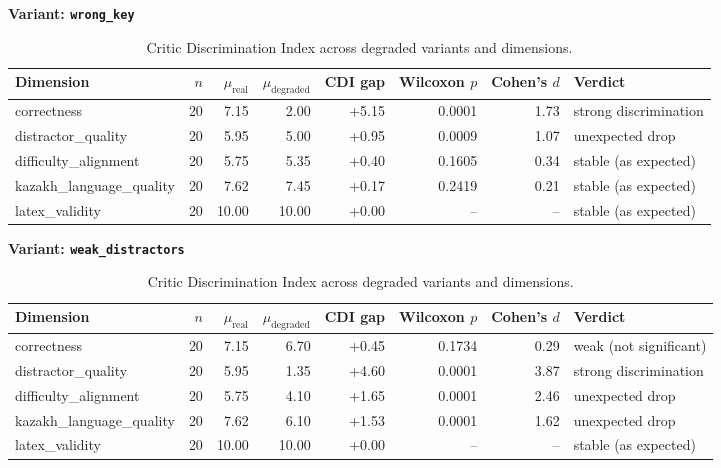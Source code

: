 \begin{table}[t]
\centering
\caption{Critic Discrimination Index across degraded variants and dimensions.}
\label{tab:cdi}
\vspace{0.5em}
\textbf{Variant: \texttt{wrong_key}}\\
\begin{tabular}{lrrrrrrl}
\hline
Dimension & $n$ & $\mu_\text{real}$ & $\mu_\text{degraded}$ & CDI gap & Wilcoxon $p$ & Cohen's $d$ & Verdict \\
\hline
correctness & 20 & 7.15 & 2.00 & +5.15 & 0.0001 & 1.73 & strong discrimination \\
distractor\_quality & 20 & 5.95 & 5.00 & +0.95 & 0.0009 & 1.07 & unexpected drop \\
difficulty\_alignment & 20 & 5.75 & 5.35 & +0.40 & 0.1605 & 0.34 & stable (as expected) \\
kazakh\_language\_quality & 20 & 7.62 & 7.45 & +0.17 & 0.2419 & 0.21 & stable (as expected) \\
latex\_validity & 20 & 10.00 & 10.00 & +0.00 & -- & -- & stable (as expected) \\
\hline
\end{tabular}
\vspace{0.5em}
\textbf{Variant: \texttt{weak_distractors}}\\
\begin{tabular}{lrrrrrrl}
\hline
Dimension & $n$ & $\mu_\text{real}$ & $\mu_\text{degraded}$ & CDI gap & Wilcoxon $p$ & Cohen's $d$ & Verdict \\
\hline
correctness & 20 & 7.15 & 6.70 & +0.45 & 0.1734 & 0.29 & weak (not significant) \\
distractor\_quality & 20 & 5.95 & 1.35 & +4.60 & 0.0001 & 3.87 & strong discrimination \\
difficulty\_alignment & 20 & 5.75 & 4.10 & +1.65 & 0.0001 & 2.46 & unexpected drop \\
kazakh\_language\_quality & 20 & 7.62 & 6.10 & +1.53 & 0.0001 & 1.62 & unexpected drop \\
latex\_validity & 20 & 10.00 & 10.00 & +0.00 & -- & -- & stable (as expected) \\
\hline
\end{tabular}
\end{table}
